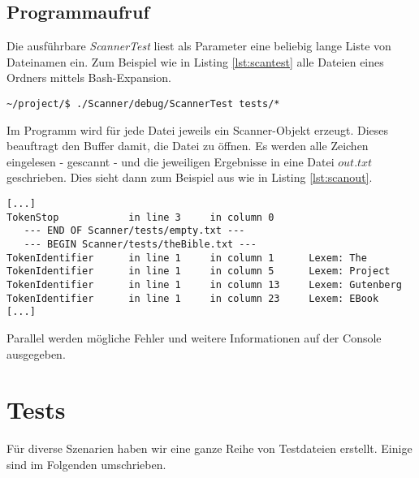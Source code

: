 \documentclass[
a4paper,   %
11pt,      %
oneside,   %
onecolumn, %
final      %
]{article}
\begin{document}
\subsection{Programmaufruf}
Die ausführbare \emph{ScannerTest} liest als Parameter eine beliebig lange Liste von Dateinamen ein. Zum Beispiel wie in Listing \ref{lst:scantest} alle Dateien eines Ordners mittels Bash-Expansion.
\begin{lstlisting}[language=PseudoCode, caption={Aufruf von ScannerTest}, label=lst:scantest]
~/project/$ ./Scanner/debug/ScannerTest tests/*
\end{lstlisting}
Im Programm wird für jede Datei jeweils ein Scanner-Objekt erzeugt. Dieses beauftragt den Buffer damit, die Datei zu öffnen. Es werden alle Zeichen eingelesen - gescannt - und die jeweiligen Ergebnisse in eine Datei $out.txt$ geschrieben. Dies sieht dann zum Beispiel aus wie in Listing \ref{lst:scanout}.
\begin{lstlisting}[language=PseudoCode, firstnumber=57, caption={Dateiausgabe von ScannerTest}, label=lst:scanout]
[...]
TokenStop            in line 3     in column 0
   --- END OF Scanner/tests/empty.txt ---
   --- BEGIN Scanner/tests/theBible.txt ---
TokenIdentifier	     in line 1     in column 1      Lexem: The
TokenIdentifier	     in line 1     in column 5      Lexem: Project
TokenIdentifier	     in line 1     in column 13     Lexem: Gutenberg
TokenIdentifier      in line 1     in column 23     Lexem: EBook
[...]
\end{lstlisting}
Parallel werden mögliche Fehler und weitere Informationen auf der Console ausgegeben.




\section{Tests}
Für diverse Szenarien haben wir eine ganze Reihe von Testdateien erstellt. Einige sind im Folgenden umschrieben.
\end{document}
